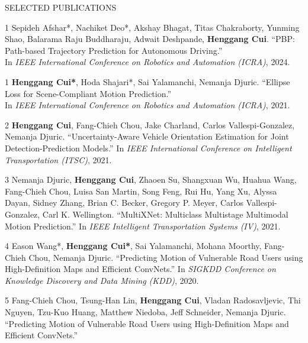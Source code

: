 \documentclass{resume} %
\begin{document}


\begin{rSection}{SELECTED PUBLICATIONS}
\vspace{-.1in}
\footnotesize{
    \item
    [1]
        Sepideh Afshar*, Nachiket Deo*, Akshay Bhagat, Titas Chakraborty, Yunming Shao, Balarama Raju Buddharaju, Adwait Deshpande, {\bf Henggang Cui}.
        ``PBP: Path-based Trajectory Prediction for Autonomous Driving.'' \\
        In \emph{IEEE International Conference on Robotics and Automation (ICRA)}, 2024.
    \item
    [1]
        {\bf Henggang Cui*}, Hoda Shajari*, Sai Yalamanchi, Nemanja Djuric.
        ``Ellipse Loss for Scene-Compliant Motion Prediction.'' \\
        In \emph{IEEE International Conference on Robotics and Automation (ICRA)}, 2021.
    \item
    [2]
        {\bf Henggang Cui}, Fang-Chieh Chou, Jake Charland, Carlos Vallespi-Gonzalez, Nemanja Djuric.
        ``Uncertainty-Aware Vehicle Orientation Estimation for Joint Detection-Prediction Models.''
        In \emph{IEEE International Conference on Intelligent Transportation (ITSC)}, 2021.
    \item
    [3]
        Nemanja Djuric, {\bf Henggang Cui}, Zhaoen Su, Shangxuan Wu, Huahua Wang, Fang-Chieh Chou, Luisa San Martin, Song Feng, Rui Hu, Yang Xu, Alyssa Dayan, Sidney Zhang, Brian C. Becker, Gregory P. Meyer, Carlos Vallespi-Gonzalez, Carl K. Wellington.
        ``MultiXNet: Multiclass Multistage Multimodal Motion Prediction.''
        In \emph{IEEE Intelligent Transportation Systems (IV)}, 2021.
    \item
    [4]
        Eason Wang*, {\bf Henggang Cui*}, Sai Yalamanchi, Mohana Moorthy, Fang-Chieh Chou, Nemanja Djuric.
        ``Predicting Motion of Vulnerable Road Users using High-Definition Maps and Efficient ConvNets.''
        In \emph{SIGKDD Conference on Knowledge Discovery and Data Mining (KDD)}, 2020.
    \item
    [5]
        Fang-Chieh Chou, Tsung-Han Lin, {\bf Henggang Cui}, Vladan Radosavljevic, Thi Nguyen, Tzu-Kuo Huang, Matthew Niedoba, Jeff Schneider, Nemanja Djuric.
        ``Predicting Motion of Vulnerable Road Users using High-Definition Maps and Efficient ConvNets.''
}
\end{rSection}
\end{document}
